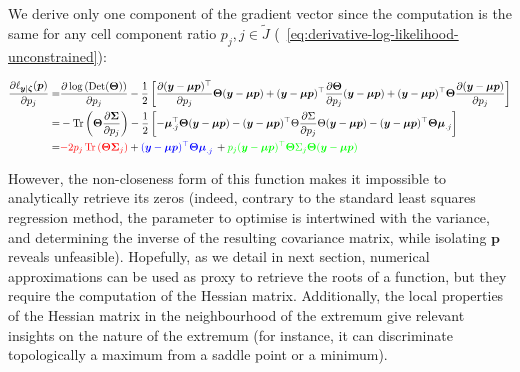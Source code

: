 \documentclass[long, final]{jobim}
\DeclareMathOperator*{\Tr}{Tr}
\DeclareMathOperator*{\DET}{Det}
\begin{document}
We derive only one component of the gradient vector since the computation is the same for any cell component ratio $p_j, j \in \widetilde{J}$ (\equationname~\ref{eq:derivative-log-likelihood-unconstrained}):

\begin{equation}
\label{eq:derivative-log-likelihood-unconstrained}
\begin{split}
\frac{\partial \ell_{\boldsymbol{y} | \boldsymbol{\zeta}}(\boldsymbol{p})}{\partial p_j} =&  \frac{\partial \log\left(\DET(\boldsymbol{\Theta})\right)}{\partial p_j} -\frac{1}{2} \left[\frac{\partial (\boldsymbol{y} - \boldsymbol{\mu} \boldsymbol{p})^\top}{\partial p_j}\boldsymbol{\Theta}(\boldsymbol{y} - \boldsymbol{\mu} \boldsymbol{p}) + (\boldsymbol{y} - \boldsymbol{\mu} \boldsymbol{p})^\top\frac{\partial\boldsymbol{\Theta}}{\partial p_j}(\boldsymbol{y} - \boldsymbol{\mu} \boldsymbol{p}) + (\boldsymbol{y} - \boldsymbol{\mu} \boldsymbol{p})^\top\boldsymbol{\Theta} \frac{\partial (\boldsymbol{y} - \boldsymbol{\mu} \boldsymbol{p})}{\partial p_j} \right]\\
=&-\Tr \left(\boldsymbol{\Theta} \frac{\partial \boldsymbol{\Sigma}}{\partial p_j} \right) - \frac{1}{2} \left[ - \boldsymbol{\mu}_{.j}^\top\boldsymbol{\Theta}(\boldsymbol{y} - \boldsymbol{\mu} \boldsymbol{p}) - (\boldsymbol{y} - \boldsymbol{\mu} \boldsymbol{p})^\top\Theta\frac{\partial \Sigma}{\partial p_j}\Theta(\boldsymbol{y} - \boldsymbol{\mu} \boldsymbol{p}) - (\boldsymbol{y} - \boldsymbol{\mu} \boldsymbol{p})^\top\boldsymbol{\Theta}  \boldsymbol{\mu}_{.j} \right] \\
=& \textcolor{red}{-2p_j \Tr \left(\boldsymbol{\Theta}\boldsymbol{\Sigma}_j\right)} +
\textcolor{blue}{(\boldsymbol{y} - \boldsymbol{\mu} \boldsymbol{p})^\top\boldsymbol{\Theta}  \boldsymbol{\mu}_{.j}} \, +
\textcolor{green}{p_j (\boldsymbol{y} - \boldsymbol{\mu} \boldsymbol{p})^\top\boldsymbol{\Theta} \Sigma_j \boldsymbol{\Theta} (\boldsymbol{y} - \boldsymbol{\mu} \boldsymbol{p})}
\end{split}
\end{equation}

However, the non-closeness form of this function makes it impossible to analytically retrieve its zeros (indeed, contrary to the standard least squares regression method, the parameter to optimise is intertwined with the variance, and determining the inverse of the resulting covariance matrix, while isolating $\boldsymbol{p}$ reveals unfeasible). Hopefully, as we detail in next section, numerical approximations can be used as proxy to retrieve the roots of a function, but they require the computation of the Hessian matrix. Additionally, the local properties of the Hessian matrix in the neighbourhood of the extremum give relevant insights on the nature of the extremum (for instance, it can discriminate topologically a maximum from a saddle point or a minimum).
\end{document}
